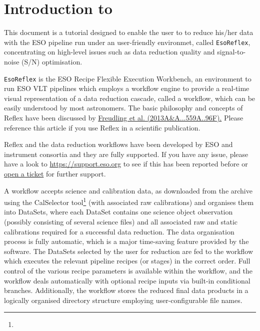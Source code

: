 \section{Introduction to \Reflex}
This document is a tutorial designed to enable the user to to reduce
his/her data with the ESO pipeline run under an user-friendly
environmet, called {\tt EsoReflex}, concentrating on high-level issues
such as data reduction quality and signal-to-noise (S/N) optimisation.




{\tt EsoReflex} is the ESO Recipe Flexible Execution 
Workbench, an environment to run ESO VLT pipelines which employs a workflow 
engine 
to provide a real-time
visual representation of a data reduction cascade, called a workflow,
which can be easily understood by most astronomers. 
The basic philosophy and concepts of Reflex have been discussed by 
\href{https://ui.adsabs.harvard.edu/abs/2013A\%26A...559A..96F/abstract}{Freudling et al. (2013A\&A...559A..96F).}
Please reference this article if you use Reflex in a scientific publication.

Reflex and the data reduction workflows have been developed by ESO and 
instrument consortia and they are fully supported. If you have any issue, 
please have a look to
\href{https://support.eso.org}{https://support.eso.org} to see if this
has been reported before or 
\href{https://support.eso.org/new-ticket}{open a ticket}
for further support.


A workflow accepts science and calibration data, as downloaded from the
archive using the CalSelector
tool\footnote{} 
(with associated raw calibrations) and
organises them into DataSets, where each DataSet contains one
science object observation (possibly consisting of several science
files) and all associated raw and static calibrations required for a
successful data reduction. The data organisation process is fully
automatic, which is a major time-saving feature provided by the
software. The DataSets selected by the user for reduction are fed
to the workflow which executes the relevant pipeline recipes (or
stages) in the correct order.
Full control of the
various recipe parameters is available within the workflow, and the
workflow deals automatically with optional recipe inputs via built-in
conditional branches. Additionally, the workflow stores the reduced
final data products in a logically organised directory structure 
employing user-configurable file names.

